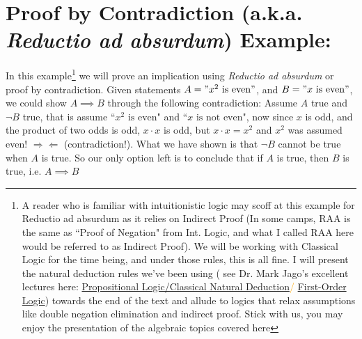 \noindent\section{Proof by Contradiction (a.k.a. 
\textit{Reductio ad absurdum}) Example:} 
\label{sec:RAAExample}
In this example\footnote{ A reader who is familiar with intuitionistic logic may scoff at this example for Reductio ad absurdum as it relies on Indirect Proof (In some camps, RAA is the same as ``Proof of Negation" from Int. Logic, and what I called RAA here would be referred to as Indirect Proof). We will be working with Classical Logic for the time being, and under those rules, this is all fine. I will present the natural deduction rules we've been using ( see Dr. Mark Jago's excellent lectures here: \textcolor{orange}{\href{https://www.youtube.com/watch?v=dlUkeN7KqVA&t=8s}{Propositional Logic/Classical Natural Deduction}/ \href{https://www.youtube.com/watch?v=C30w5vZypXE}{First-Order Logic}}) towards the end of the text and allude to logics that relax assumptions like double negation elimination and indirect proof. Stick with us, you may enjoy the presentation of the algebraic topics covered here \smiley } we will prove an implication using \textit{Reductio ad absurdum} or proof by contradiction. Given statements $A= "x^2 \text{ is even}"$, and $B= "x \text{ is even}"$, we could show $A\implies B$ through the following contradiction: Assume $A$ true and $\lnot B$ true, that is assume ``$x^2 \text{ is even}$" and ``$x \text{ is not even}$", now since $x$ is odd, and the product of two odds is odd, $x\cdot x$ is odd, but $x\cdot x=x^2$ and $x^2$ was assumed even! $\Rightarrow\Leftarrow$ (contradiction!). What we have shown is that $\lnot B$ cannot be true when $A$ is true. So our only option left is to conclude that if $A$ is true, then $B$ is true, i.e. $A\implies B$

